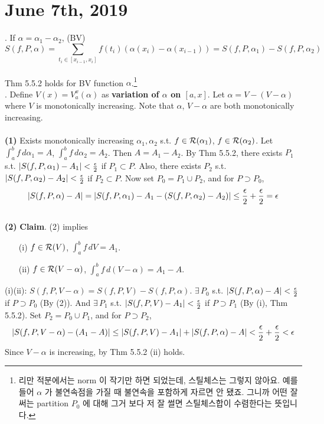 \section*{June 7th, 2019}
\rmk. If $\alpha = \alpha_1 - \alpha_2$, (BV) $$S(f, P, \alpha) = \sum_{t_i\in [x_{i-1}, x_i]}f(t_i)(\alpha(x_i)-\alpha(x_{i-1})) = S(f, P, \alpha_1) - S(f, P, \alpha_2)$$
\\
 Thm 5.5.2 holds for BV function $\alpha$.\footnote{리만 적분에서는 norm 이 작기만 하면 되었는데, 스틸체스는 그렇지 않아요. 예를 들어 $\alpha$ 가 불연속점을 가질 때 불연속을 포함하게 자르면 안 됐죠. 그니까 어떤 잘 써는 partition $P_0$ 에 대해 그거 보다 저 잘 썰면 스틸체스합이 수렴한다는 뜻입니다.}\\
\pf. Define $V(x) = V_a^x(\alpha)$ as \textbf{variation of $\alpha$ on $ [a, x] $}. Let $\alpha = V - (V-\alpha)$ where $V$ is monotonically increasing. Note that $\alpha$, $V-\alpha$ are both monotonically increasing.\\
\\
\textbf{(1)} Exists monotonically increasing $\alpha_1, \alpha_2$ s.t. $f\in \mathcal{R}(\alpha_1)$, $f\in \mathcal{R}(\alpha_2)$. Let $\int_a^b f\,d\alpha_1 = A$, $\int_a^b f\,d\alpha_2 = A_2$. Then $A = A_1-A_2$. By Thm 5.5.2, there exists $P_1$ s.t. $\left|S(f, P, \alpha_1) - A_1\right| < \frac{\epsilon}{2}$ if $P_1\subset P$. Also, there exists $P_2$ s.t. $\left|S(f, P, \alpha_2) - A_2\right| < \frac{\epsilon}{2}$ if $P_2\subset P$. Now set $P_0 = P_1\cup P_2$, and for $P \supset P_0$, 
$$\left|S(f, P, \alpha) - A\right| = \left|S(f, P, \alpha_1)- A_1 -(S(f, P, \alpha_2) - A_2)\right| \leq \frac{\epsilon}{2} + \frac{\epsilon}{2}  =\epsilon$$\\
\textbf{(2)} \textbf{Claim}. (2) implies
\begin{enumerate}
	\item[(i)] $f\in \mathcal{R}(V)$, $\int_a^b f\,dV = A_1$.
	\item[(ii)] $f\in \mathcal{R}(V-\alpha)$, $\int_a^b f\,d(V-\alpha) = A_1 - A$.
\end{enumerate}
(i)\mimp(ii): $S(f, P, V-\alpha) = S(f, P, V) - S(f, P, \alpha)$.
$\exists\,P_0$ s.t. $\left|S(f,P, \alpha) -A\right| < \frac{\epsilon}{2}$ if $P\supset P_0$ (By (2)). And $\exists\,P_1$ s.t. $\left|S(f, P, V)-A_1\right| < \frac{\epsilon}{2}$ if $P\supset P_1$ (By (i), Thm 5.5.2). Set $P_2 = P_0 \cup P_1$, and for $P\supset P_2$,
$$\left|S(f, P, V-\alpha) - (A_1-A)\right| \leq \left|S(f, P, V) - A_1\right| + \left|S(f, P, \alpha) - A\right| < \frac{\epsilon}{2} + \frac{\epsilon}{2} < \epsilon$$
Since $V-\alpha$ is increasing, by Thm 5.5.2 (ii) holds.\\
